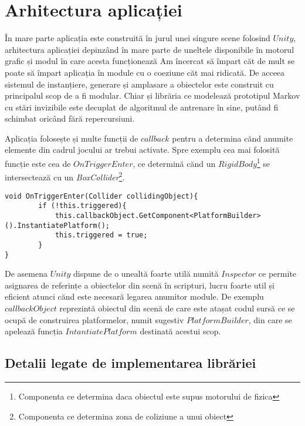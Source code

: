 \chapter{Arhitectura aplicației}

În mare parte aplicația este construită în jurul unei singure scene folosind $Unity$, arhitectura aplicației depinzând în mare parte de uneltele disponibile în motorul grafic și modul în care acesta funcționează Am încercat să împart căt de mult se poate să împart aplicația în module cu o coeziune căt mai ridicată. De acceea sistemul de instanțiere, generare și amplasare a obiectelor este construit cu principalul scop de a fi modular. Chiar și librăria ce modelează prototipul Markov cu stări invizibile este decuplat de algoritmul de antrenare în sine, putând fi schimbat oricând fără repercursiuni.\par

Aplicația folosește și multe funcții de $callback$ pentru a determina cănd anumite elemente din cadrul jocului ar trebui activate. Spre exemplu cea mai folosită funcție este cea de $OnTriggerEnter$, ce determină cănd un $RigidBody$\footnote{Componenta ce determina daca obiectul este supus motorului de fizica} se intersectează cu un \textit{Box}\textit{Collider}\footnote{Componenta ce determina zona de coliziune a unui obiect}.\par

\begin{lstlisting}[caption=Exemplu de utilizare a functiei OnTriggerEnter]
void OnTriggerEnter(Collider collidingObject){
        if (!this.triggered){
            this.callbackObject.GetComponent<PlatformBuilder>().InstantiatePlatform();
            this.triggered = true;
        }
}
\end{lstlisting}
\par

De asemena $Unity$ dispune de o unealtă foarte utilă numită $Inspector$ ce permite asignarea de referințe a obiectelor din scenă în scripturi, lucru foarte util și eficient atunci cănd este necesară legarea anumitor module. De exemplu $callbackObject$ reprezintă obiectul din scenă de care este atașat codul sursă ce se ocupă de construirea platformelor, numit sugestiv $PlatformBuilder$, din care se apelează funcția $IntantiatePlatform$ destinată acestui scop.\par

\section{Detalii legate de implementarea librăriei}

